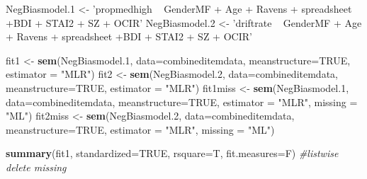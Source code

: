 \documentclass[]{article}
\newenvironment{Shaded}{\begin{snugshade}}{\end{snugshade}}
\newcommand{\KeywordTok}[1]{\textcolor[rgb]{0.13,0.29,0.53}{\textbf{#1}}}
\newcommand{\DataTypeTok}[1]{\textcolor[rgb]{0.13,0.29,0.53}{#1}}
\newcommand{\DecValTok}[1]{\textcolor[rgb]{0.00,0.00,0.81}{#1}}
\newcommand{\StringTok}[1]{\textcolor[rgb]{0.31,0.60,0.02}{#1}}
\newcommand{\CommentTok}[1]{\textcolor[rgb]{0.56,0.35,0.01}{\textit{#1}}}
\newcommand{\OtherTok}[1]{\textcolor[rgb]{0.56,0.35,0.01}{#1}}
\newcommand{\NormalTok}[1]{#1}
\begin{document}
\begin{Shaded}
\begin{Highlighting}[]
\NormalTok{NegBiasmodel.}\DecValTok{1}\NormalTok{ <-}\StringTok{ 'propmedhigh ~ GenderMF + Age + Ravens + spreadsheet +BDI + STAI2 + SZ + OCIR'}
\NormalTok{NegBiasmodel.}\DecValTok{2}\NormalTok{ <-}\StringTok{ 'driftrate ~ GenderMF + Age + Ravens + spreadsheet +BDI + STAI2 + SZ + OCIR'}


\NormalTok{fit1 <-}\StringTok{ }\KeywordTok{sem}\NormalTok{(NegBiasmodel.}\DecValTok{1}\NormalTok{, }\DataTypeTok{data=}\NormalTok{combineditemdata, }\DataTypeTok{meanstructure=}\OtherTok{TRUE}\NormalTok{,  }\DataTypeTok{estimator =} \StringTok{"MLR"}\NormalTok{)}
\NormalTok{fit2 <-}\StringTok{ }\KeywordTok{sem}\NormalTok{(NegBiasmodel.}\DecValTok{2}\NormalTok{, }\DataTypeTok{data=}\NormalTok{combineditemdata, }\DataTypeTok{meanstructure=}\OtherTok{TRUE}\NormalTok{,  }\DataTypeTok{estimator =} \StringTok{"MLR"}\NormalTok{)}
\NormalTok{fit1miss <-}\StringTok{ }\KeywordTok{sem}\NormalTok{(NegBiasmodel.}\DecValTok{1}\NormalTok{, }\DataTypeTok{data=}\NormalTok{combineditemdata, }\DataTypeTok{meanstructure=}\OtherTok{TRUE}\NormalTok{,  }\DataTypeTok{estimator =} \StringTok{"MLR"}\NormalTok{, }\DataTypeTok{missing =} \StringTok{"ML"}\NormalTok{)}
\NormalTok{fit2miss <-}\StringTok{ }\KeywordTok{sem}\NormalTok{(NegBiasmodel.}\DecValTok{2}\NormalTok{, }\DataTypeTok{data=}\NormalTok{combineditemdata, }\DataTypeTok{meanstructure=}\OtherTok{TRUE}\NormalTok{,  }\DataTypeTok{estimator =} \StringTok{"MLR"}\NormalTok{, }\DataTypeTok{missing =} \StringTok{"ML"}\NormalTok{)}



\KeywordTok{summary}\NormalTok{(fit1, }\DataTypeTok{standardized=}\OtherTok{TRUE}\NormalTok{, }\DataTypeTok{rsquare=}\NormalTok{T, }\DataTypeTok{fit.measures=}\NormalTok{F) }\CommentTok{#listwise delete missing}
\end{Highlighting}
\end{Shaded}
\end{document}
